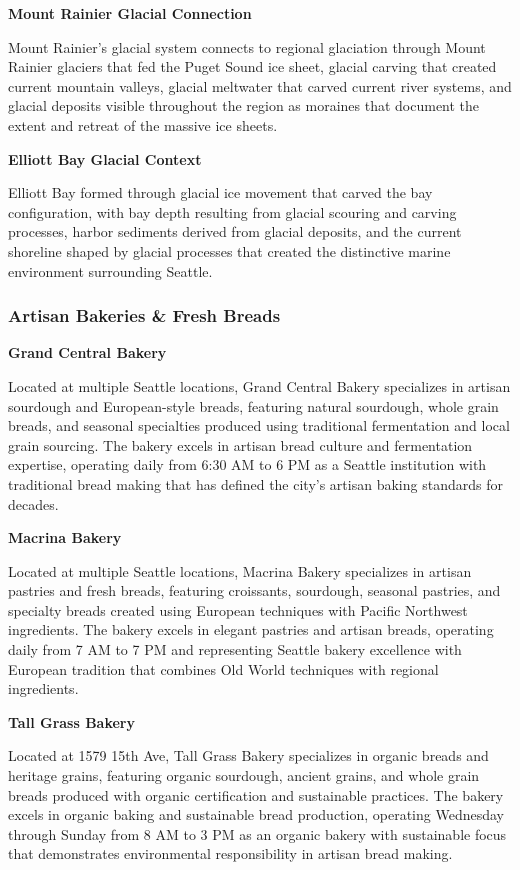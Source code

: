 \documentclass[
  11pt,
  letterpaper,
  DIV=10,
  numbers=noendperiod]{scrartcl}
\begin{document}
\textbf{Mount Rainier Glacial Connection}

Mount Rainier's glacial system connects to regional glaciation through
Mount Rainier glaciers that fed the Puget Sound ice sheet, glacial
carving that created current mountain valleys, glacial meltwater that
carved current river systems, and glacial deposits visible throughout
the region as moraines that document the extent and retreat of the
massive ice sheets.

\textbf{Elliott Bay Glacial Context}

Elliott Bay formed through glacial ice movement that carved the bay
configuration, with bay depth resulting from glacial scouring and
carving processes, harbor sediments derived from glacial deposits, and
the current shoreline shaped by glacial processes that created the
distinctive marine environment surrounding Seattle.

\subsubsection{Artisan Bakeries \& Fresh
Breads}\label{artisan-bakeries-fresh-breads-5}

\textbf{Grand Central Bakery}

Located at multiple Seattle locations, Grand Central Bakery specializes
in artisan sourdough and European-style breads, featuring natural
sourdough, whole grain breads, and seasonal specialties produced using
traditional fermentation and local grain sourcing. The bakery excels in
artisan bread culture and fermentation expertise, operating daily from
6:30 AM to 6 PM as a Seattle institution with traditional bread making
that has defined the city's artisan baking standards for decades.

\textbf{Macrina Bakery}

Located at multiple Seattle locations, Macrina Bakery specializes in
artisan pastries and fresh breads, featuring croissants, sourdough,
seasonal pastries, and specialty breads created using European
techniques with Pacific Northwest ingredients. The bakery excels in
elegant pastries and artisan breads, operating daily from 7 AM to 7 PM
and representing Seattle bakery excellence with European tradition that
combines Old World techniques with regional ingredients.

\textbf{Tall Grass Bakery}

Located at 1579 15th Ave, Tall Grass Bakery specializes in organic
breads and heritage grains, featuring organic sourdough, ancient grains,
and whole grain breads produced with organic certification and
sustainable practices. The bakery excels in organic baking and
sustainable bread production, operating Wednesday through Sunday from 8
AM to 3 PM as an organic bakery with sustainable focus that demonstrates
environmental responsibility in artisan bread making.
\end{document}
